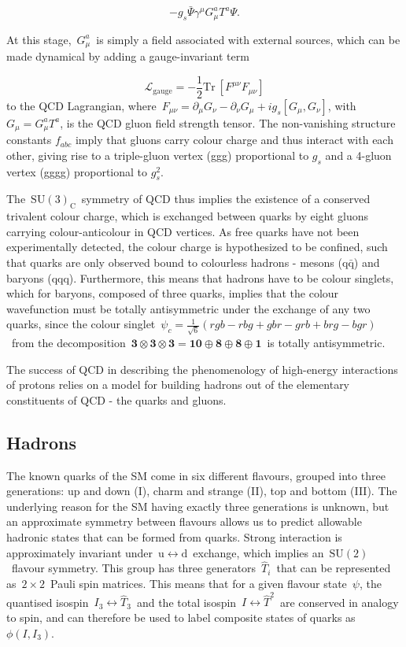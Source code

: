 \begin{equation}
- g_s \bar{\Psi} \gamma^\mu G^a_\mu T^a \Psi.
\end{equation}

At this stage,~$G^a_\mu$~is simply a field associated with external sources, which can be made dynamical by adding a gauge-invariant term

\begin{equation}
\mathcal{L}_{\mathrm{gauge}} = - \frac{1}{2} \mathrm{Tr}\ [F^{\mu\nu} F_{\mu\nu}] 
\end{equation}
to the QCD Lagrangian, where~$F_{\mu\nu} = \partial_\mu G_\nu - \partial_\nu G_\mu + i g_s [G_\mu, G_\nu]$, with $G_\mu = G_\mu^a T^a$, is the QCD gluon field strength tensor. The non-vanishing structure constants $f_{abc}$ imply that gluons carry colour charge and thus interact with each other, giving rise to a triple-gluon vertex (ggg) proportional to $g_s$ and a 4-gluon vertex (gggg) proportional to $g_s^2$.

The~$\mathrm{SU}(3)_{\mathrm{C}}$~symmetry of QCD thus implies the existence of a conserved trivalent colour charge, which is exchanged between quarks by eight gluons carrying colour-anticolour in QCD vertices. As free quarks have not been experimentally detected, the colour charge is hypothesized to be confined, such that quarks are only observed bound to colourless hadrons - mesons ($\mathrm{q}\bar{\mathrm{q}}$) and baryons (qqq). Furthermore, this means that hadrons have to be colour singlets, which for baryons, composed of three quarks, implies that the colour wavefunction must be totally antisymmetric under the exchange of any two quarks, since the colour  singlet~$\psi_c = \frac{1}{\sqrt{6}} (rgb - rbg + gbr - grb + brg - bgr)$~from the decomposition~$\mathbf{3}\otimes \mathbf{3} \otimes \mathbf{3} = \mathbf{10} \oplus \mathbf{8} \oplus \mathbf{8} \oplus \mathbf{1}$~is totally antisymmetric.

The success of QCD in describing the phenomenology of high-energy interactions of protons relies on a model for building hadrons out of the elementary constituents of QCD - the quarks and gluons.

\subsection{Hadrons}
The known quarks of the SM come in six different flavours, grouped into three generations: up and down (I), charm and strange (II), top and bottom (III). The underlying reason for the SM having exactly three generations is unknown, but an approximate symmetry between flavours allows us to predict allowable hadronic states that can be formed from quarks. Strong interaction is approximately invariant under~$\mathrm{u} \leftrightarrow \mathrm{d}$~exchange, which implies an~$\mathrm{SU}(2)$~flavour symmetry. This group has three generators~$\hat{T}_i$~that can be represented as~$2\times2$~Pauli spin matrices. This means that for a given flavour state~$\psi$, the quantised isospin~$I_3 \leftrightarrow \hat{T}_3$~and the total isospin~$I \leftrightarrow \hat{T}^2$~are conserved in analogy to spin, and can therefore be used to label composite states of quarks as~$\phi(I, I_3)$.

